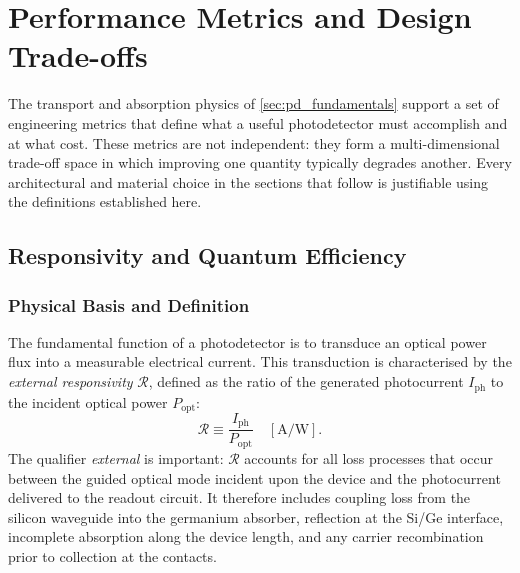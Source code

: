 \section[Performance Metrics]{Performance Metrics and Design Trade-offs}
\label{sec:pd_metrics}

The transport and absorption physics of \cref{sec:pd_fundamentals} support a set
of engineering metrics that define what a useful photodetector must accomplish and
at what cost. These metrics are not independent: they form a multi-dimensional
trade-off space in which improving one quantity typically degrades another. Every
architectural and material choice in the sections that follow is justifiable
using the definitions established here.

\subsection[Responsivity and Quantum Efficiency]{Responsivity and Quantum Efficiency}
\label{subsec:pd_responsivity}

\subsubsection{Physical Basis and Definition}

The fundamental function of a photodetector is to transduce an optical power flux
into a measurable electrical current. This transduction is characterised by the
\emph{external responsivity} $\mathcal{R}$, defined as the ratio of the
generated photocurrent $I_{\mathrm{ph}}$ to the incident optical power
$P_{\mathrm{opt}}$:
\begin{equation}
    \mathcal{R} \equiv \frac{I_{\mathrm{ph}}}{P_{\mathrm{opt}}}
    \quad [\si{\ampere\per\watt}].
    \label{eq:responsivity}
\end{equation}
The qualifier \emph{external} is important: $\mathcal{R}$ accounts for all
loss processes that occur between the guided optical mode incident upon the
device and the photocurrent delivered to the readout circuit. It therefore
includes coupling loss from the silicon waveguide into the germanium absorber,
reflection at the Si/Ge interface, incomplete absorption along the device
length, and any carrier recombination prior to collection at the contacts.

